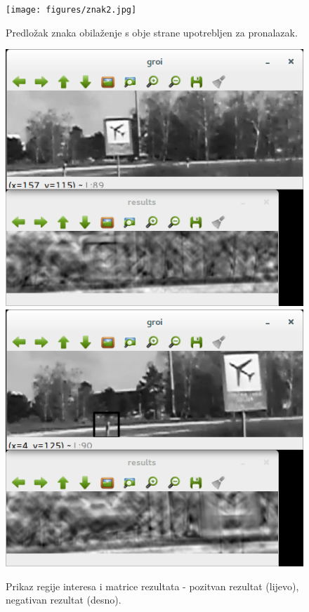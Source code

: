 \begin{figure}[h]
\centering
\texttt{[image: figures/znak2.jpg]}
\caption{Predložak znaka obilaženje s obje strane upotrebljen za pronalazak.}
\label{fig:obz4}
\end{figure} 

\begin{figure}[!htb]
    \includegraphics[width=\linewidth]{figures/08.png}
\endminipage\hfill
{}
    \includegraphics[width=\linewidth]{figures/09.png}
\endminipage\hfill
\caption{Prikaz regije interesa i matrice rezultata - pozitvan rezultat
(lijevo), negativan rezultat (desno).}
\label{fig:obz1}
\end{figure}


